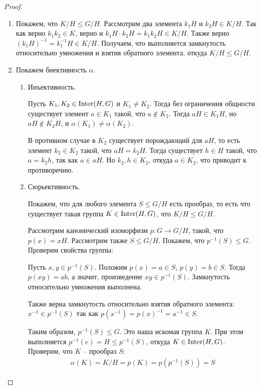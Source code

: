 \begin{proof}~
    \begin{enumerate}
        \item Покажем, что $K/H \leq G/H$. Рассмотрим два элемента $k_1H$ и $k_2H \in K/H$. Так как верно 
        $k_1 k_2 \in K$, верно и $k_1 H \cdot k_2H = k_1k_2H \in K/H$. Также верно 
        $(k_1H)^{-1} = k_1^{-1}H \in K/H$. Получаем, что выполняется замкнутость относительно 
        умножения и взятия обратного элемента, откуда $K/H \leq G/H$.
        \item Покажем биективность $\alpha$.
        \begin{enumerate}
            \item Инъективность. 
            
            Пусть $K_1, K_2 \in \operatorname{\text{Inter}}(H, G)$ и $K_1 \neq K_2$.
            Тогда без ограничения общности существует элемент $a \in K_1$ такой, что $a \notin K_2$. 
            Тогда $aH \in K_1H$, но $aH \notin K_2H$, и $\alpha(K_1) \neq \alpha(K_2)$. 
            
            В противном случае в $K_2$ существует порождающий для $aH$, то есть элемент $k_2 \in K_2$ такой, 
            что $aH = k_2H$. Тогда существует $h \in H$ такой, что $a = k_2h$, так как $a \in aH$.
            Но $k_2, h \in K_2$, откуда $a \in K_2$, что приводит к противоречию.
            \item Сюрьективность.
            
            Покажем, что для любого элемента $S \leq G/H$ есть прообраз, то есть что существует 
            такая группа $K \in \operatorname{\text{Inter}}(H, G)$, что $K/H \leq G/H$.
            
            Рассмотрим канонический изоморфизм $p: G \to G/H$, такой, что $p(x) = xH$.
            Рассмотрим также $S \leq G/H$. Покажем, что $p^{-1}(S) \leq G$. Проверим свойства группы:
            
            Пусть $x, y \in p^{-1}(S)$. Положим $p(x) = a \in S$, $p(y) = b \in S$. Тогда $p(xy) = ab$,
            а значит, произведение $xy \in p^{-1}(S)$. Замкнутость относительно умножения выполнена.
            
            Также верна замкнутость относительно взятия обратного элемента: $x^{-1} \in p^{-1}(S)$ так как $p(x^{-1}) = p(x)^{-1} 
            = a^{-1} \in S$.

            Таким образом, $p^{-1}(S) \leq G$. Это наша искомая группа $K$. При этом выполняется 
            $p^{-1}(e) = H \leq p^{-1}(S)$, откуда $K \in \operatorname{\text{Inter}}(H, G)$. Проверим, что $K$ -- прообраз $S$:
            \begin{gather*}
                \alpha(K) = K/H = p(K) = p(p^{-1}(S)) = S
            \end{gather*}


\end{enumerate}
\end{enumerate}
\end{proof}
